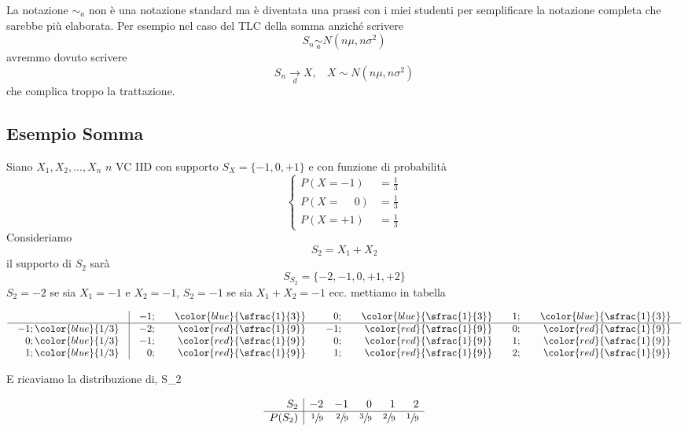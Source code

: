 \documentclass[
  11pt,
]{book}
\theoremstyle{mytheoremstyle}
\theoremstyle{mydefstyle}
\newenvironment{nota}
  {
\begin{tcolorbox}[enhanced,breakable,arc=0.1mm,boxrule=1pt,colback=white,colframe=iblue,title=\bf \fontfamily{lmss}\selectfont \faInfoCircle \hspace{.5 cm} Nota,drop fuzzy shadow]
}{
\end{tcolorbox}
  }
\begin{document}
\begin{nota}
La notazione \(\operatorname*{\sim}_{a}\) non è una notazione standard ma
è diventata una prassi con i miei studenti per semplificare la notazione
completa che sarebbe più elaborata. Per esempio nel caso del TLC della
somma anziché scrivere \[
S_n\operatorname*{\sim}_{a} N(n\mu,n\sigma^2)
\] avremmo dovuto scrivere \[
S_n\operatorname*{\rightarrow}_{d} X,~~~~ X\sim N(n\mu,n\sigma^2)
\] che complica troppo la trattazione.

\end{nota}

\subsection{Esempio Somma}\label{esempio-somma}

Siano \(X_1, X_2,...,X_n\) \(n\) VC IID con supporto \(S_X=\{-1,0,+1\}\) e con
funzione di probabilità \[
\begin{cases}
P(X=-1)&=\frac 13\\
P(X=\phantom{-}0)&=\frac 13\\
P(X=+1)&=\frac 13
\end{cases}
\] Consideriamo \[
S_2=X_1+X_2
\] il supporto di \(S_2\) sarà \[S_{S_2}=\{-2,-1,0,+1,+2 \} \] \(S_2=-2\) se
sia \(X_1=-1\) e \(X_2=-1\), \(S_2=-1\) se sia \(X_1+X_2=-1\) ecc. mettiamo in
tabella

\normalsize

\[\arraycolsep=10pt\def\arraystretch{1}\begin{array}{ r|rrrrrr }
& -1 ;&\color{blue}{ \sfrac{ 1 } { 3 }} & 0 ;&\color{blue}{ \sfrac{ 1 } { 3 }} & 1 ;&\color{blue}{ \sfrac{ 1 } { 3 }} \\ 
\hline 
-1 ;\color{blue}{ 1 / 3 }& -2;&\color{red}{\sfrac{1}{9}}& -1;&\color{red}{\sfrac{1}{9}}& 0;&\color{red}{\sfrac{1}{9}}\\ 
0 ;\color{blue}{ 1 / 3 }& -1;&\color{red}{\sfrac{1}{9}}& 0;&\color{red}{\sfrac{1}{9}}& 1;&\color{red}{\sfrac{1}{9}}\\ 
1 ;\color{blue}{ 1 / 3 }& 0;&\color{red}{\sfrac{1}{9}}& 1;&\color{red}{\sfrac{1}{9}}& 2;&\color{red}{\sfrac{1}{9}}\\ 
\end{array}
 \]

\normalsize E ricaviamo la distribuzione di, S\_2

\normalsize

\[
     \begin{array}{ r|rrrrr }
 S_2  & -2& -1& 0& 1& 2 \\ 
 \hline 
 P( S_2 ) & \sfrac{1}{9}& \sfrac{2}{9}& \sfrac{3}{9}& \sfrac{2}{9}& \sfrac{1}{9} \\ 
 \end{array}
 \]
\end{document}
